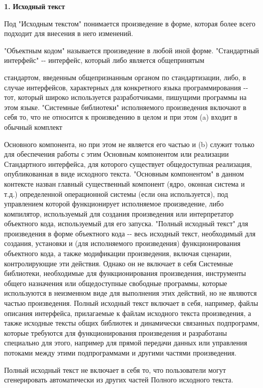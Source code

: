 {\bfseries{1.}} {\bfseries{Исходный}} {\bfseries{текст}}

Под "{}Исходным текстом"{} понимается произведение в форме, которая более всего подходит для внесения в него изменений.

"{}Объектным кодом"{} называется произведение в любой иной форме. "{}Стандартный интерфейс"{} -\/-\/ интерфейс, который либо является общепринятым

стандартом, введенным общепризнанным органом по стандартизации, либо, в случае интерфейсов, характерных для конкретного языка программирования -\/-\/ тот, который широко используется разработчиками, пишущими программы на этом языке. "{}Системные библиотеки"{} исполняемого произведения включают в себя то, что не относится к произведению в целом и при этом (a) входит в обычный комплект

Основного компонента, но при этом не является его частью и (b) служит только для обеспечения работы с этим Основным компонентом или реализации Стандартного интерфейса, для которого существует общедоступная реализация, опубликованная в виде исходного текста. "{}Основным компонентом"{} в данном контексте назван главный существенный компонент (ядро, оконная система и т.\+д.) определенной операционной системы (если она используется), под управлением которой функционирует исполняемое произведение, либо компилятор, используемый для создания произведения или интерпретатор объектного кода, используемый для его запуска. "{}Полный исходный текст"{} для произведения в форме объектного кода -\/-\/ весь исходный текст, необходимый для создания, установки и (для исполняемого произведения) функционирования объектного кода, а также модификации произведения, включая сценарии, контролирующие эти действия. Однако он не включает в себя Системные библиотеки, необходимые для функционирования произведения, инструменты общего назначения или общедоступные свободные программы, которые используются в неизменном виде для выполнения этих действий, но не являются частью произведения. Полный исходный текст включает в себя, например, файлы описания интерфейса, прилагаемые к файлам исходного текста произведения, а также исходные тексты общих библиотек и динамически связанных подпрограмм, которые требуются для функционирования произведения и разработаны специально для этого, например для прямой передачи данных или управления потоками между этими подпрограммами и другими частями произведения.

Полный исходный текст не включает в себя то, что пользователи могут сгенерировать автоматически из других частей Полного исходного текста.

